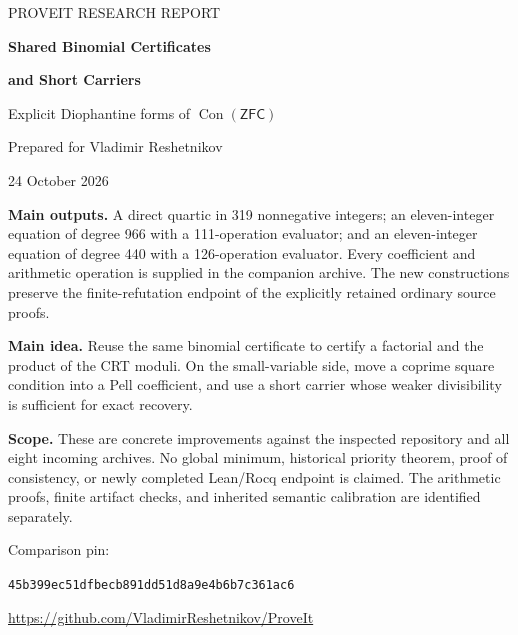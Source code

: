 \documentclass[11pt]{article}
\newcommand{\Con}{\operatorname{Con}}
\newcommand{\ZFC}{\mathsf{ZFC}}
\theoremstyle{definition}\newtheorem{definition}[theorem]{Definition}
\theoremstyle{remark}\newtheorem{remark}[theorem]{Remark}
\begin{document}
\hypersetup{pageanchor=false}
\begin{titlepage}
\vspace*{0.7in}
{\color{MidnightBlue}\large PROVEIT RESEARCH REPORT\par}
\vspace{0.35in}
{\Huge\bfseries Shared Binomial Certificates\par}
\vspace{0.12in}
{\Huge\bfseries and Short Carriers\par}
\vspace{0.3in}
{\LARGE Explicit Diophantine forms of $\Con(\ZFC)$\par}
\vspace{0.45in}
{\large Prepared for Vladimir Reshetnikov\par}
{\large 24 October 2026\par}
\vspace{0.5in}
\begin{minipage}{0.94\linewidth}
\textbf{Main outputs.} A direct quartic in 319 nonnegative integers; an
eleven-integer equation of degree 966 with a 111-operation evaluator; and
an eleven-integer equation of degree 440 with a 126-operation evaluator.
Every coefficient and arithmetic operation is supplied in the companion
archive. The new constructions preserve the finite-refutation endpoint of
the explicitly retained ordinary source proofs.

\medskip
\textbf{Main idea.} Reuse the same binomial certificate to certify a
factorial and the product of the CRT moduli. On the small-variable side,
move a coprime square condition into a Pell coefficient, and use a short
carrier whose weaker divisibility is sufficient for exact recovery.

\medskip
\textbf{Scope.} These are concrete improvements against the inspected
repository and all eight incoming archives. No global minimum, historical
priority theorem, proof of consistency, or newly completed Lean/Rocq
endpoint is claimed. The arithmetic proofs, finite artifact checks, and
inherited semantic calibration are identified separately.
\end{minipage}
\vfill
{\small Comparison pin:\par
\texttt{45b399ec51dfbecb891dd51d8a9e4b6b7c361ac6}\par
\url{https://github.com/VladimirReshetnikov/ProveIt}}
\end{titlepage}
\hypersetup{pageanchor=true}
\end{document}
